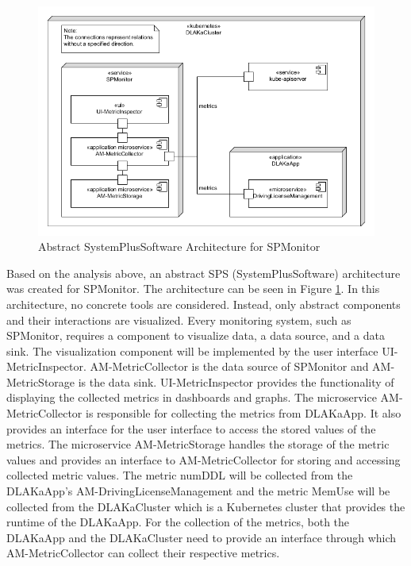 \begin{figure}[tb]
  \centering
  \includegraphics[width=\textwidth]{figures/abstract_sps_spmonitor.png}
  \caption{Abstract SystemPlusSoftware Architecture for SPMonitor}
  \label{fig:abstract_sps_spmonitor}
\end{figure}

Based on the analysis above, an abstract SPS (SystemPlusSoftware) architecture
was created for SPMonitor. The architecture can be seen in Figure
\ref{fig:abstract_sps_spmonitor}. In this architecture, no concrete tools are
considered. Instead, only abstract components and their interactions are
visualized. 
Every monitoring system, such as SPMonitor, requires a component to visualize data,
a data source, and a data sink. The visualization component will be
implemented by the user interface UI-MetricInspector. AM-MetricCollector is the
data source of SPMonitor and AM-MetricStorage is the data sink.
UI-MetricInspector provides the functionality of displaying the collected
metrics in dashboards and graphs. The microservice AM-MetricCollector is
responsible for collecting the metrics from DLAKaApp. It also provides an
interface for the user interface to access the stored values of the metrics.
The microservice AM-MetricStorage handles the storage of the metric values and
provides an interface to AM-MetricCollector for storing and accessing collected
metric values. The metric numDDL will be collected from the DLAKaApp's
AM-DrivingLicenseManagement and the metric MemUse will be collected
from the DLAKaCluster which is a Kubernetes cluster that provides the runtime
of the DLAKaApp. For the collection of the metrics, both the DLAKaApp and the
DLAKaCluster need to provide an interface through which AM-MetricCollector can
collect their respective metrics.


